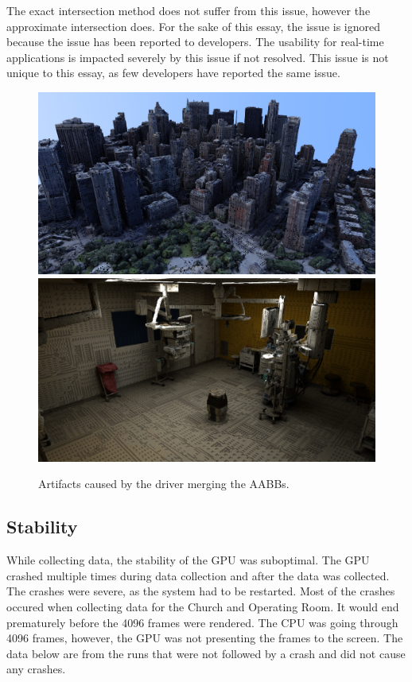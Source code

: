 \documentclass[12pt]{article}
\begin{document}
The exact intersection method does not suffer from this issue, however the approximate intersection does.
For the sake of this essay, the issue is ignored because the issue has been reported to developers.
The usability for real-time applications is impacted severely by this issue if not resolved.
This issue is not unique to this essay, as few developers have reported the same issue.
\parencite{NVIDIA:AABB-Merging}

\begin{figure}[H]
    \begin{center}
        \includegraphics[scale=0.25]{NewYorkCity-Merging}
        \smallbreak
        \includegraphics[scale=0.25]{OperationRoom-Merging}
    \end{center}
    \caption{
        Artifacts caused by the driver merging the AABBs.
        }
        \label{fig:Scenes-Merging}
\end{figure}

\subsection{Stability}

While collecting data, the stability of the GPU was suboptimal. The GPU crashed multiple times
during data collection and after the data was collected.
The crashes were severe, as the system had to be restarted. Most of the crashes occured
when collecting data for the Church and Operating Room. It would end prematurely before the 4096 frames were rendered.
The CPU was going through 4096 frames, however, the GPU was not presenting the frames to the screen.
The data below are from the runs that were not followed by a crash and did not cause any crashes.
\end{document}
